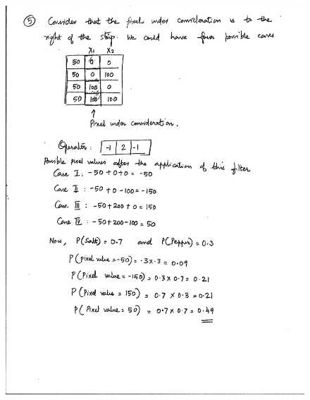 \documentclass{article}
\begin{document}
\begin{figure}
\includegraphics[width=15cm]{5.jpg}
\end{figure}
\end{document}
